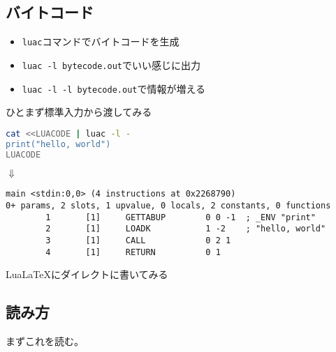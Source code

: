 \subsection{バイトコード}
\begin{frame}[fragile]
	\frametitlesubs
	\begin{itemize}
		\item \lstinline{luac}コマンドでバイトコードを生成
		\item \lstinline{luac -l bytecode.out}でいい感じに出力
		\item \lstinline{luac -l -l bytecode.out}で情報が増える
	\end{itemize}
\end{frame}
\begin{frame}[fragile]
	\frametitlesubs
ひとまず標準入力から渡してみる
	\small
	\begin{lstlisting}[numbers=none,language=sh]
cat <<LUACODE | luac -l -
print("hello, world")
LUACODE
	\end{lstlisting}
	\pause
	\begin{center}$\Downarrow$\end{center}
	\begin{lstlisting}[numbers=none]
main <stdin:0,0> (4 instructions at 0x2268790)
0+ params, 2 slots, 1 upvalue, 0 locals, 2 constants, 0 functions
        1       [1]     GETTABUP        0 0 -1  ; _ENV "print"
        2       [1]     LOADK           1 -2    ; "hello, world"
        3       [1]     CALL            0 2 1
        4       [1]     RETURN          0 1\end{lstlisting}
\end{frame}
\begin{frame}[fragile]
	\frametitlesubs
	\textrm{Lua\LaTeX}にダイレクトに書いてみる
	\bgroup
	\scriptsize
	\tiny
	\egroup
\end{frame}
\subsection{読み方}
\begin{frame}[fragile]
	\frametitlesubs
	\tiny
	\normalsize

	まずこれを読む。
\end{frame}
